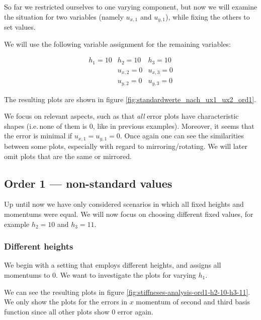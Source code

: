 \documentclass{article}
\begin{document}
So far we restricted ourselves to one varying component, but now we will examine the situation for two variables (namely $u_{x,1}$ and $u_{y,1}$), while fixing the others to set values.

We will use the following variable assignment for the remaining variables:

\begin{eqnarray*}
  h_1 = 10 & h_2 = 10 & h_3 = 10 \\
   & u_{x,2} = 0 & u_{x,3} = 0 \\
   & u_{y,2} = 0 & u_{y,3} = 0
\end{eqnarray*}

The resulting plots are shown in figure \ref{fig:standardwerte_nach_ux1_ux2_ord1}.



We focus on relevant aspects, such as that \emph{all} error plots have characteristic shapes (i.e.\,none of them is 0, like in previous examples). Moreover, it seems that the error is minimal if $u_{x,1}=u_{y,1}=0$. Once again one can see the similarities between some plots, especially with regard to mirroring/rotating. We will later omit plots that are the same or mirrored.

\clearpage{} %

\subsection{Order 1 --- non-standard values}
\label{sec:stiffness-analysis-ord1-non-std-values}

Up until now we have only considered scenarios in which all fixed heights and momentums were equal. We will now focus on choosing different fixed values, for example $h_2=10$ and $h_3=11$.

\subsubsection{Different heights}
\label{sec:stiffness-analysis-ord1-differing-h2-10-h3-11}

We begin with a setting that employs different heights, and assigns all momentums to 0. We want to investigate the plots for varying $h_1$.



We can see the resulting plots in figure \ref{fig:stiffneses-analysis-ord1-h2-10-h3-11}. We only show the plots for the errors in $x$ momentum of second and third basis function since all other plots show 0 error again.
\end{document}
